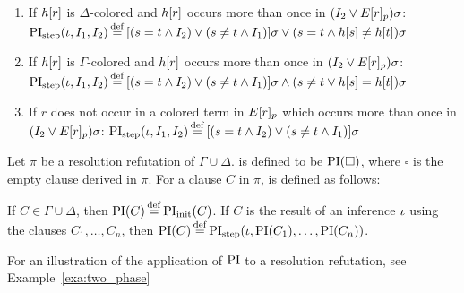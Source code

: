 \begin{defi}[$\PIstep$]
\begin{indproof}
			\begin{enumerate}
				\item If $h[r]$ is $\Delta$-colored and $h[r]$ occurs more than once in $(I_2 \lor E{[r]_{p}})\sigma$: %
					\label{def:PI_paramod_1}
					$\PIstep(\inference, I_1, I_2) \defeq{} [ ( s=t \land I_2 ) \lor (s\neq t \land I_1) ]\sigma \lor (s=t \land h\occur{s} \neq h\occur{t})\sigma$
				\item If $h[r]$ is $\Gamma$-colored and $h[r]$ occurs more than once in $(I_2 \lor E{[r]_{p}})\sigma$:
					\label{def:PI_paramod_2}
					$\PIstep(\inference, I_1, I_2) \defeq{} [ ( s=t \land I_2 ) \lor (s\neq t \land I_1) ]\sigma \land (s\neq t \lor h\occur{s} = h\occur{t})\sigma$
				\item If $r$ does not occur in a colored term in $E{[r]_{p}}$ which occurs more than once in\nolinebreak{} $(I_2 \lor E{[r]_{p}})\sigma$:
					\label{def:PI_paramod_3}
					\newline
					$\PIstep(\inference, I_1, I_2) \defeq{} [ ( s=t \land I_2 ) \lor (s\neq t \land I_1) ]\sigma$
					\qedhere

			\end{enumerate}
	\end{indproof}
\end{defi}



\begin{defi}
	\label{def:PI}
	Let $\pi$ be a resolution refutation of $\Gamma \cup \Delta$.
	 is defined to be $\operatorname{PI}(\square)$, where $\square$ is the empty clause derived in $\pi$.
	For a clause $C$ in $\pi$,  is defined as follows:
	\begin{indproof}
			If $C \in \Gamma\cup\Delta$, then $\PI(C) \defeq \PIinit(C)$.
			If $C$ is the result of an inference $\iota$ using the clauses $C_1, \dots, C_n$, then $\PI(C) \defeq \PIstep(\inference, \PI(C_1), \dots, \PI(C_n))$.
			\qedhere
	\end{indproof}
\end{defi}

For an illustration of the application of $\operatorname{PI}$ to a resolution refutation, see Example~\ref{exa:two_phase}

